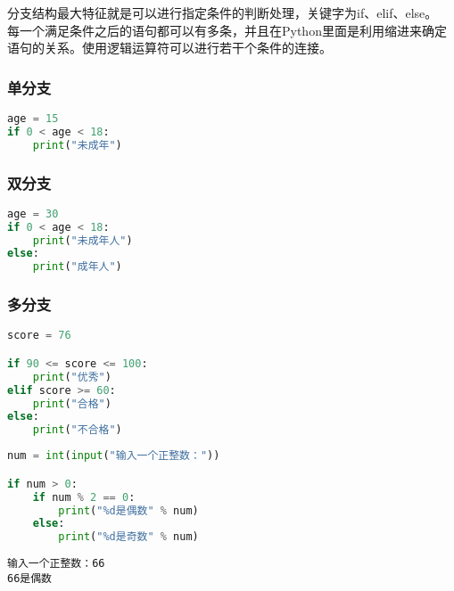 分支结构最大特征就是可以进行指定条件的判断处理，关键字为if、elif、else。\\

每一个满足条件之后的语句都可以有多条，并且在Python里面是利用缩进来确定语句的关系。使用逻辑运算符可以进行若干个条件的连接。

\subsubsection{单分支}

\vspace{-1cm}

\begin{lstlisting}[language=Python]
age = 15
if 0 < age < 18:
    print("未成年")
\end{lstlisting}

\subsubsection{双分支}

\vspace{-1cm}

\begin{lstlisting}[language=Python]
age = 30
if 0 < age < 18:
    print("未成年人")
else:
    print("成年人")
\end{lstlisting}

\subsubsection{多分支}

\vspace{-1cm}

\begin{lstlisting}[language=Python]
score = 76

if 90 <= score <= 100:
    print("优秀")
elif score >= 60:
    print("合格")
else:
    print("不合格")
\end{lstlisting}

\vspace{0.5cm}


\begin{lstlisting}[language=Python]
num = int(input("输入一个正整数："))

if num > 0:
    if num % 2 == 0:
        print("%d是偶数" % num)
    else:
        print("%d是奇数" % num)
\end{lstlisting}

\begin{tcolorbox}
    \begin{verbatim}
输入一个正整数：66
66是偶数
	\end{verbatim}
\end{tcolorbox}

